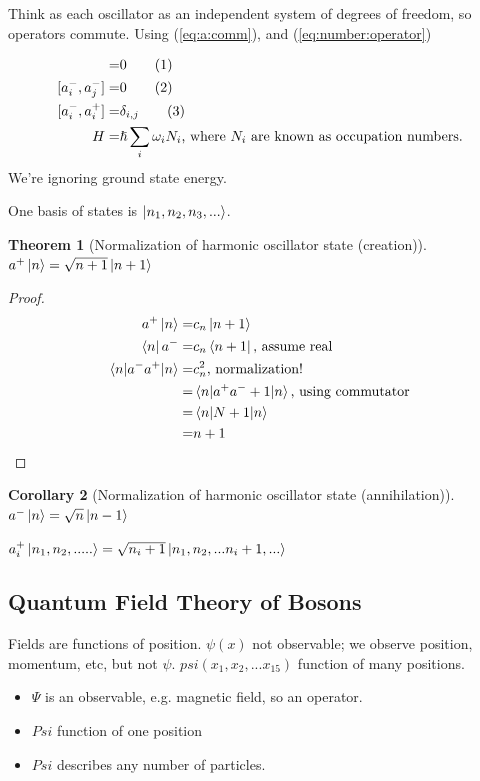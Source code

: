 \documentclass[]{article}
\newcommand\numberthis{\addtocounter{equation}{1}\tag{\theequation}}
\newtheorem{thm}{Theorem}
\newtheorem{cor}[thm]{Corollary}
\begin{document}
Think as each oscillator  as an independent system of degrees of freedom, so operators commute. Using  (\ref{eq:a:comm}), and (\ref{eq:number:operator})

\begin{align*}
[a^+_i,a^+_j] =& 0 \numberthis \label{eq:a:comm_i_plus}\\
[a^-_i,a^-_j] =& 0 \numberthis \label{eq:a:comm_i_minus}\\
[a^-_i,a^+_i] =& \delta_{i,j} \numberthis \label{eq:a:comm_i}\\
H =& \hslash \sum_{i}  \omega_i N_i\text{, where $N_i$ are known as occupation numbers.}
\end{align*}
We're ignoring ground state energy.

One basis of states is $\ket{n_1,n_2,n_3,...}$.

\begin{thm}[Normalization of harmonic oscillator state (creation)]
	$a^+\ket{n}=\sqrt{n+1}\ket{n+1}$
\end{thm} 

\begin{proof}
	\begin{align*}
	a^+\ket{n}=&c_n\ket{n+1}\\
	\bra{n}a^-=&c_n\bra{n+1}\text{, assume real}\\
	\braket{n|a^-a^+|n}=&c_n^2\text{, normalization!}\\
	=& \braket{n|a^+a^-+1|n}\text{, using commutator}\\
	=& \braket{n|N+1|n}\\
	=&n+1
	\end{align*}
\end{proof}

\begin{cor}[Normalization of harmonic oscillator state (annihilation)]
	$a^-\ket{n}=\sqrt{n}\ket{n-1}$
\end{cor}


$a_i^+\ket{n_1,n_2,.....}=\sqrt{n_i+1}\ket{n_1,n_2,...n_i+1,...}$

\subsection{Quantum Field Theory of Bosons}

Fields are functions of position. $\psi(x)$ not observable; we observe position, momentum, etc, but not $\psi$. $psi(x_1,x_2,...x_15)$ function of many positions.

\begin{itemize}
	\item $\Psi$ is an observable, e.g. magnetic field, so an operator.
	\item $Psi$ function of one position
	\item $Psi$ describes any number of particles.
\end{itemize}
\end{document}
